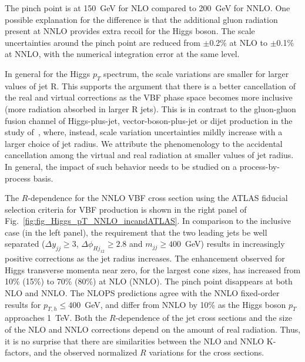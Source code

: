 \documentclass[10pt,prd,fleqn,superscriptaddress,notitlepage,nofootinbib,preprintnumbers,nobalancelastpage]{revtex4-1}
\newcommand{\VBF}{VBF\xspace}
\begin{document}
The pinch point is at 150~GeV for NLO compared to 200~GeV for NNLO. One possible explanation for the difference is that the additional gluon radiation present at NNLO provides extra recoil for the Higgs boson.
The scale uncertainties around the pinch point are reduced from $\pm$0.2\% at NLO to $\pm$0.1\% at NNLO, with the numerical integration error at the same level.

In general for the Higgs $p_T$ spectrum, the scale variations are smaller for larger values of  jet R.  This supports the argument that there is a better cancellation of the real and virtual corrections as the \VBF phase space becomes more inclusive (more radiation absorbed in larger R jets).
This is in contrast to the gluon-gluon fusion channel of Higgs-plus-jet, vector-boson-plus-jet or dijet production in the study of~\cite{Bellm:2019yyh}, where, instead, scale variation uncertainties mildly increase with a larger choice of jet radius. We attribute the phenomenology to the accidental cancellation among the virtual and real radiation at smaller values of jet radius. In general, the impact of such behavior needs to be studied on a process-by-process basis.

The $R$-dependence for the NNLO \VBF cross section using the ATLAS fiducial selection criteria for \VBF production is shown in the right panel of Fig.~\ref{fig:fig_Higgs_pT_NNLO_incandATLAS}. In comparison to the inclusive case (in the left panel), the requirement that the two leading jets be well separated ($\Delta y_{jj} \ge 3$, $\Delta \phi_{Hj_{12}} \geq 2.8 $ and $m_{jj} \geq 400$~GeV) results in increasingly positive corrections as the  jet radius increases.
The enhancement observed  for Higgs transverse momenta near zero, for the largest cone sizes, has increased from 10\% (15\%) to 70\% (80\%) at NLO (NNLO). The  pinch point disappears at both NLO and NNLO.
The NLOPS predictions agree with the NNLO fixed-order results for $p_{T,h}\le 400$~GeV, and differ  from NNLO by 10\% as the Higgs boson $p_T$ approaches 1~TeV. Both the $R$-dependence of the jet cross sections and the size of the NLO and NNLO corrections depend on the amount of real radiation. Thus, it is no surprise that there are similarities between the NLO and NNLO K-factors, and the observed normalized $R$ variations for the cross sections.
\end{document}
